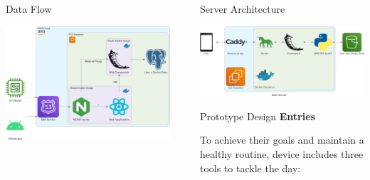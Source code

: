 \documentclass[final]{beamer}
\newlength{\sepwidth}
\newlength{\colwidth}
\newcommand{\separatorcolumn}{\begin{column}{\sepwidth}\end{column}}
\begin{document}
\begin{frame}[t]
\begin{columns}[t]
\begin{column}{\colwidth}
  \begin{block}{Data Flow}
    \vskip 0.5cm
    \begin{center}
      \includegraphics[width = 0.8 \linewidth]{data_flow.png}
    \end{center}
  \end{block}
\end{column}

\separatorcolumn

\begin{column}{\colwidth}
  \begin{block}{Server Architecture}
    \vskip 0.5cm
    \begin{center}
      \includegraphics[width = 0.8 \linewidth]{web_server.png}
    \end{center}
  \end{block}

    \begin{block}{Prototype Design}
    \textbf{Entries}

    To achieve their goals and maintain a healthy routine, device includes three tools to tackle the day:


\end{block}
\end{column}
\end{columns}
\end{frame}
\end{document}
